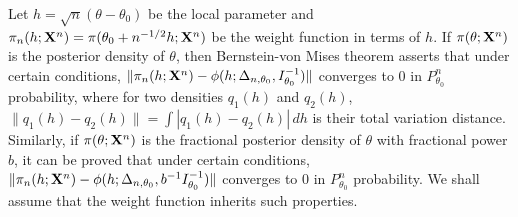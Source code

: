 \documentclass[11pt]{article}
\theoremstyle{plain}
\theoremstyle{definition}
\theoremstyle{remark}
\begin{document}
Let $h=\sqrt{n}(\theta-\theta_0)$ be the local parameter and $\pi_n(h;\mathbf{X}^{n})=\pi(\theta_0+n^{-1/2}h;\mathbf{X}^{n})$ be the weight function in terms of $h$.
If $\pi(\theta;\mathbf{X}^{n})$ is the posterior density of $\theta$, then Bernstein-von Mises theorem asserts that under certain conditions,
$
            \|\pi_n(h;\mathbf{X}^{n})-\phi(h;\Delta_{n,\theta_0},I_{\theta_0}^{-1})\|
$
converges to $0$ in $P_{\theta_0}^n$ probability,
where for two densities $q_1(h)$ and $q_2(h)$, $\|q_1(h)-q_2(h)\|=\int |q_1(h)-q_2(h)|\, dh$ is their total variation distance.
Similarly, if $\pi(\theta;\mathbf{X}^{n})$ is the fractional posterior density of $\theta$ with fractional power $b$, it can be proved that under certain conditions,
$
\|\pi_n(h;\mathbf{X}^{n})-\phi(h;\Delta_{n,\theta_0},b^{-1} I_{\theta_0}^{-1})\|
$
converges to $0$ in $P_{\theta_0}^n$ probability.
We shall assume that the weight function inherits such properties.
        
\end{document}

